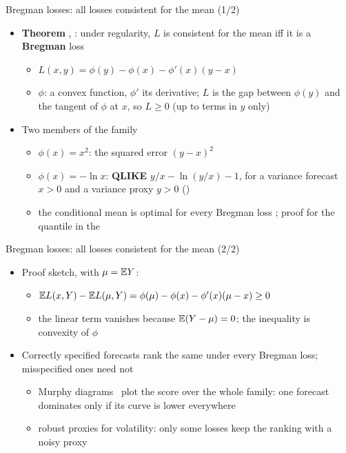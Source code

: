 \begin{frame}{Bregman losses: all losses consistent for the mean (1/2)}
\itemsize{\small}
\begin{itemize}
    \item \textbf{Theorem} , : under regularity, $L$ is consistent for the mean iff it is a \textbf{Bregman} loss
    \begin{itemize}
        \item $L(x, y) = \phi(y) - \phi(x) - \phi'(x)(y - x)$
        \item $\phi$: a convex function, $\phi'$ its derivative; $L$ is the gap between $\phi(y)$ and the tangent of $\phi$ at $x$, so $L \ge 0$ (up to terms in $y$ only)
    \end{itemize}
    \item Two members of the family
    \begin{itemize}
        \item $\phi(x) = x^2$: the squared error $(y - x)^2$
        \item $\phi(x) = -\ln x$: \textbf{QLIKE} $y/x - \ln(y/x) - 1$, for a variance forecast $x > 0$ and a variance proxy $y > 0$ ()
        \item the conditional mean is optimal for every Bregman loss ; proof for the quantile in the 
    \end{itemize}
\end{itemize}
\end{frame}

\begin{frame}{Bregman losses: all losses consistent for the mean (2/2)}
\itemsize{\small}
\begin{itemize}
    \item Proof sketch, with $\mu = \mathbb{E} Y$:
    \begin{itemize}
        \item $\mathbb{E} L(x, Y) - \mathbb{E} L(\mu, Y) = \phi(\mu) - \phi(x) - \phi'(x)(\mu - x) \ge 0$
        \item the linear term vanishes because $\mathbb{E}(Y - \mu) = 0$; the inequality is convexity of $\phi$
    \end{itemize}
    \item Correctly specified forecasts rank the same under every Bregman loss; misspecified ones need not 
    \begin{itemize}
        \item Murphy diagrams \ plot the score over the whole family: one forecast dominates only if its curve is lower everywhere
        \item robust proxies for volatility: only some losses keep the ranking with a noisy proxy 
    \end{itemize}
\end{itemize}
\end{frame}

